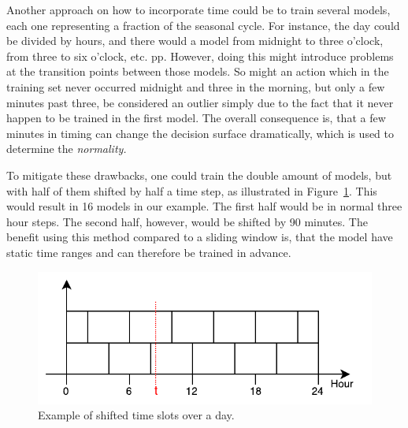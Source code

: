 Another approach on how to incorporate time could be to train several models, each one representing a fraction of the seasonal cycle. For instance, the day could be divided by hours, and there would a model from midnight to three o'clock, from three to six o'clock, etc. pp.
However, doing this might introduce problems at the transition points between those models. So might an action which in the training set never occurred midnight and three in the morning, but only a few minutes past three, be considered an outlier simply due to the fact that it never happen to be trained in the first model.
The overall consequence is, that a few minutes in timing can change the decision surface dramatically, which is used to determine the \emph{normality.}

To mitigate these drawbacks, one could train the double amount of models, but with half of them shifted by half a time step, as illustrated in Figure~\ref{fig:background:network:features:time}.
This would result in 16 models in our example. The first half would be in normal three hour steps. The second half, however, would be shifted by 90 minutes.
The benefit using this method compared to a sliding window is, that the model have static time ranges and can therefore be trained in advance.

\begin{figure}[h]
	\centering
	\includegraphics[]{figures/300-time-slots.pdf}
	\caption{Example of shifted time slots over a day.}
	\label{fig:background:network:features:time}
\end{figure}

